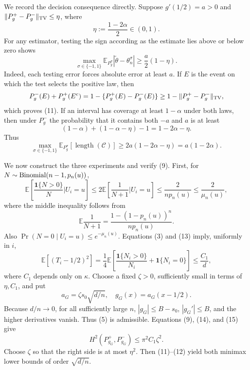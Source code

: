 We record the decision consequence directly.  Suppose \(g'(1/2)=a>0\) and \(\|P_g^+-P_g^-\|_{\rm TV}\leq\eta\), where
\[
 \eta:=\frac{1-2\alpha}{2}\in(0,1).
\tag{10}
\]
For any estimator, testing the sign according as the estimate lies above or below zero shows
\[
 \max_{\sigma\in\{-1,1\}}
 \mathbb E_{P_g^\sigma}|\widetilde\theta-\theta_n^\sigma|
 \geq\frac a2(1-\eta).
\tag{11}
\]
Indeed, each testing error forces absolute error at least \(a\).  If \(E\) is the event on which the test selects the positive law, then
\[
 P_g^-(E)+P_g^+(E^c)
 =1-\{P_g^+(E)-P_g^-(E)\}
 \geq1-\|P_g^+-P_g^-\|_{\rm TV},
\]
which proves (11).  If an interval has coverage at least \(1-\alpha\) under both laws, then under \(P_g^-\) the probability that it contains both \(-a\) and \(a\) is at least
\[
 (1-\alpha)+(1-\alpha-\eta)-1=1-2\alpha-\eta.
\]
Thus
\[
 \max_{\sigma\in\{-1,1\}}
 \mathbb E_{P_g^\sigma}[\operatorname{length}(\mathcal C)]
 \geq2a(1-2\alpha-\eta)=a(1-2\alpha).
\tag{12}
\]

We now construct the three experiments and verify (9).  First, for \(N\sim{\rm Binomial}(n-1,p_n(u))\),
\[
 \mathbb E\!\left[\frac{\mathbf1\{N>0\}}N\mathrel{\Big|}U_i=u\right]
 \leq2\mathbb E\!\left[\frac1{N+1}\mathrel{\Big|}U_i=u\right]
 \leq\frac2{np_n(u)}\leq\frac2{\mu_n(u)},
\tag{13}
\]
where the middle inequality follows from
\[
 \mathbb E\frac1{N+1}
 =\frac{1-(1-p_n(u))^n}{np_n(u)}.
\]
Also \(\Pr(N=0\mid U_i=u)\leq e^{-\mu_n(u)}\).  Equations (3) and (13) imply, uniformly in \(i\),
\[
 \mathbb E\left[(T_i-1/2)^2\right]
 =\frac14\mathbb E\!\left[\frac{\mathbf1\{N_i>0\}}{N_i}
 +\mathbf1\{N_i=0\}\right]
 \leq\frac{C_1}{d},
\tag{14}
\]
where \(C_1\) depends only on \(\kappa\).  Choose a fixed \(\zeta>0\), sufficiently small in terms of \(\eta,C_1\), and put
\[
 a_G=\zeta s_0\sqrt{d/n},\quad g_G(x)=a_G(x-1/2).
\tag{15}
\]
Because \(d/n\to0\), for all sufficiently large \(n\), \(|g_G|\leq B-s_0\), \(|g_G'|\leq B\), and the higher derivatives vanish.  Thus (5) is admissible.  Equations (9), (14), and (15) give
\[
 H^2(P_{g_G}^+,P_{g_G}^-)
 \leq\pi^2C_1\zeta^2.
\tag{16}
\]
Choose \(\zeta\) so that the right side is at most \(\eta^2\).  Then (11)--(12) yield both minimax lower bounds of order \(\sqrt{d/n}\).

